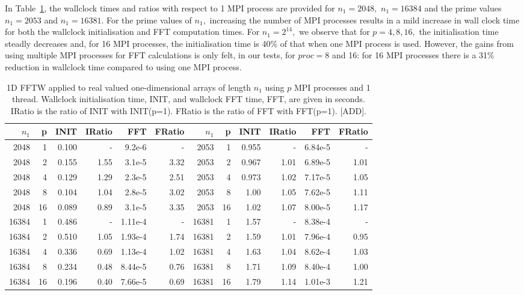 \documentclass[a4]{article}
\begin{document}
In Table~\ref{Tbl:FFT1d}, the wallclock times and ratios with respect to 1 MPI process are provided for $n_1=2048,$ $n_1=16384$ and the prime values $n_1=2053$ and $n_1=16381.$ For the prime values of $n_1,$ increasing the number of MPI processes results in a mild increase in wall clock time for both the wallclock initialisation and FFT computation times. For $n_1=2^{14},$ we observe that for $p=4,8,16,$ the initialisation time steadly decreases and, for 16 MPI processes, the initialisation time is 40\% of that when one MPI process is used. However, the gains from using multiple MPI processes for FFT calculations is only felt, in our tests, for $proc=8$ and 16: for 16 MPI processes there is a 31\% reduction in wallclock time compared to using one MPI process.  




\begin{table}
\begin{center}
\begin{tabular}{|r|r|r|r|r|r||r|r|r|r|r|r|}
\hline $n_1$ & p & INIT & IRatio & FFT & FRatio & $n_1$ & p & INIT & IRatio & FFT & FRatio  \\ \hline
2048 & 1 & 0.100 & -     & 9.2e-6 & - & 2053 & 1  & 0.955 & -   & 6.84e-5 & -   \\
2048 & 2 & 0.155 & 1.55  & 3.1e-5 & 3.32 & 2053 & 2  & 0.967 & 1.01 & 6.89e-5 & 1.01  \\
2048 & 4 & 0.129 & 1.29  & 2.3e-5 & 2.51 & 2053 & 4  & 0.973 & 1.02 & 7.17e-5 & 1.05   \\
2048 & 8 & 0.104 & 1.04  & 2.8e-5 & 3.02 & 2053 & 8  & 1.00 & 1.05 &  7.62e-5 & 1.11  \\
2048 & 16 & 0.089 & 0.89 & 3.1e-5 & 3.35 & 2053 & 16 & 1.02 & 1.07 &  8.00e-5 & 1.17   \\ \hline
16384 & 1 &  0.486 & - &    1.11e-4 & -  & 16381 & 1 & 1.57 & -    & 8.38e-4 & -   \\
16384 & 2 &  0.510 & 1.05 & 1.93e-4 & 1.74 & 16381 & 2 & 1.59 & 1.01 & 7.96e-4 & 0.95    \\
16384 & 4 &  0.336 & 0.69 & 1.13e-4 & 1.02  & 16381 & 4 & 1.63 & 1.04 & 8.62e-4 & 1.03    \\
16384 & 8 &  0.234 & 0.48 & 8.44e-5 & 0.76  & 16381 & 8 & 1.71 & 1.09 & 8.40e-4 & 1.00    \\
16384 & 16 & 0.196 & 0.40 & 7.66e-5 & 0.69  & 16381 & 16 & 1.79 & 1.14 & 1.01e-3 & 1.21   \\ \hline
\end{tabular}
\caption{1D FFTW applied to real valued one-dimensional arrays of length $n_1$ using $p$ MPI processes and 1 thread. Wallclock initialisation time, INIT, and wallclock FFT time, FFT, are given in seconds. IRatio is the ratio of INIT with INIT(p=1). FRatio is the ratio of FFT with FFT(p=1).  [ADD].}\label{Tbl:FFT1d}
\end{center}
\end{table}
\end{document}
